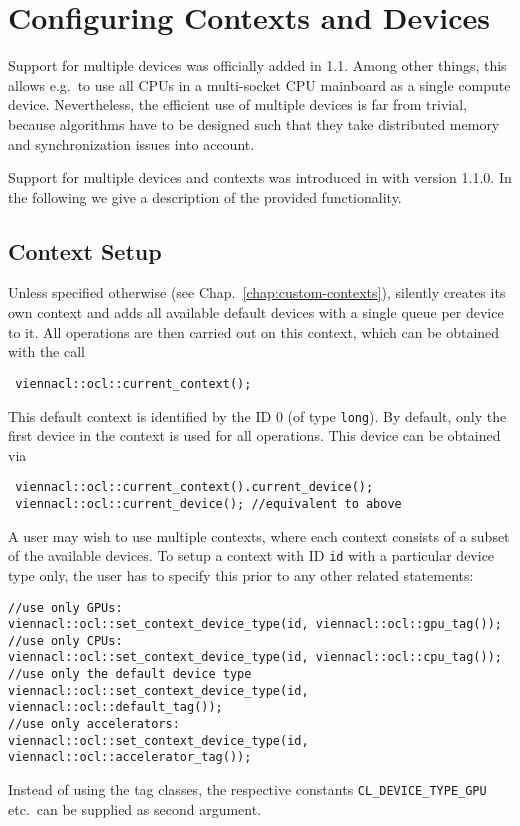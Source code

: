 
\chapter{Configuring Contexts and Devices} \label{chap:multi-devices}
Support for multiple devices was officially added in {\OpenCL} 1.1.
Among other things, this allows e.g.~to use all CPUs in a multi-socket CPU mainboard as a single {\OpenCL} compute device.
Nevertheless, the efficient use of multiple {\OpenCL} devices is far from trivial, because algorithms have to be designed such that 
they take distributed memory and synchronization issues into account.

Support for multiple devices and contexts was introduced in {\ViennaCL} with version 1.1.0. In the following we give a description of the 
provided functionality.

\section{Context Setup}
Unless specified otherwise (see Chap.~\ref{chap:custom-contexts}), {\ViennaCL} silently creates its own context and adds all available default devices with a single queue per device to it.
All operations are then carried out on this context, which can be obtained with the call
\begin{lstlisting}
 viennacl::ocl::current_context();
\end{lstlisting}
This default context is identified by the ID $0$ (of type \lstinline|long|).
By default, only the first device in the context is used for all operations. This device can be obtained via
\begin{lstlisting}
 viennacl::ocl::current_context().current_device();
 viennacl::ocl::current_device(); //equivalent to above
\end{lstlisting}

A user may wish to use multiple contexts, where each context consists of a subset of the available devices. 
To setup a context with ID \lstinline|id| with a particular device type only, the user has to specify this 
prior to any other {\ViennaCL} related statements:
\begin{lstlisting}
//use only GPUs:
viennacl::ocl::set_context_device_type(id, viennacl::ocl::gpu_tag());
//use only CPUs:
viennacl::ocl::set_context_device_type(id, viennacl::ocl::cpu_tag());
//use only the default device type
viennacl::ocl::set_context_device_type(id, viennacl::ocl::default_tag());
//use only accelerators:
viennacl::ocl::set_context_device_type(id, viennacl::ocl::accelerator_tag());
\end{lstlisting}
Instead of using the tag classes, the respective {\OpenCL} constants \texttt{CL\_DEVICE\_TYPE\_GPU} etc.~can be supplied as second argument.

